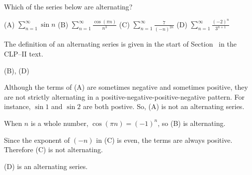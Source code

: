 \begin{question}
Which of the series below are alternating?

\hfill(A) $\displaystyle\sum_{n=1}^\infty \sin n$\hfill
(B) $\displaystyle\sum_{n=1}^\infty \frac{\cos(\pi n)}{n^3}$\hfill
(C) $\displaystyle\sum_{n=1}^\infty \frac{7}{(-n)^{2n}}$\hfill
(D) $\displaystyle\sum_{n=1}^\infty \frac{(-2)^n}{3^{n+1}}$\hfill~
\end{question}
\begin{hint}
The definition of an alternating series is given in the start of Section~
 in the CLP--II text.
\end{hint}
\begin{answer}
(B), (D)
\end{answer}
\begin{solution}
Although the terms of (A) are sometimes negative and sometimes positive, they are not strictly alternating in a  positive-negative-positive-negative pattern. For instance, $\sin 1$ and $\sin 2$ are both postive. So, (A) is not an alternating series.

When $n$ is a whole number, $\cos(\pi n) = (-1)^n$, so (B) is alternating.

Since the exponent of $(-n)$ in (C) is even, the terms are always positive. Therefore (C) is not alternating.

(D) is an alternating series.
\end{solution}

